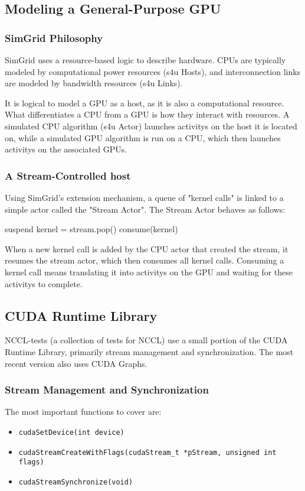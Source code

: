 \documentclass[11pt,a4paper]{article}
\begin{document}
\subsection{Modeling a General-Purpose GPU}
\subsubsection{SimGrid Philosophy}
SimGrid uses a resource-based logic to describe hardware. CPUs are typically 
modeled by computational power resources (s4u Hosts), and interconnection 
links are modeled by bandwidth resources (s4u Links).

It is logical to model a GPU as a \gls{host}, as it is also a computational 
resource. What differentiates a CPU from a GPU is how they interact with 
resources. A simulated CPU algorithm (s4u Actor) launches \glspl{activity} 
on the host it is located on, while a simulated GPU algorithm is run on a 
CPU, which then launches \glspl{activity} on the associated GPUs.

\subsubsection{A Stream-Controlled \gls{host}}
Using SimGrid's extension mechanism, a queue of "kernel calls" is linked to a 
simple \gls{actor} called the "Stream Actor". The Stream Actor behaves as follows:

\begin{algorithmic}
            \STATE suspend
        \ELSE
            \STATE kernel = stream.pop()
            \STATE consume(kernel)
        \ENDIF
    \ENDWHILE
\end{algorithmic}

When a new kernel call is added by the CPU \gls{actor} that created the stream, 
it resumes the stream \gls{actor}, which then consumes all kernel calls. Consuming 
a kernel call means translating it into \glspl{activity} on the GPU and waiting 
for these \glspl{activity} to complete.

\subsection{CUDA Runtime Library}
NCCL-tests (a collection of tests for NCCL) use a small portion of the CUDA Runtime 
Library, primarily stream management and synchronization. The most recent version 
also uses CUDA Graphs.

\subsubsection{Stream Management and Synchronization}
The most important functions to cover are:
\begin{itemize}
    \item \texttt{cudaSetDevice(int device)}
    \item \texttt{cudaStreamCreateWithFlags(cudaStream\_t *pStream, unsigned int flags)}
    \item \texttt{cudaStreamSynchronize(void)}
\end{itemize}
\end{document}
